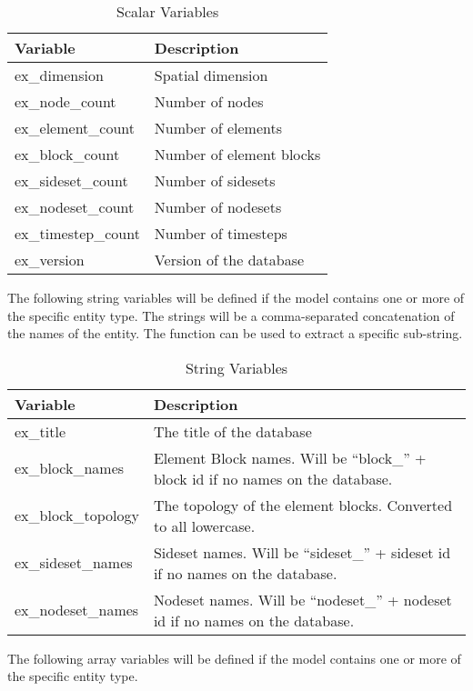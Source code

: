 \begin{longtable}{lp{4.0in}}
\caption{\exo{} Scalar Variables}\\
Variable              & Description \\
\hline
\endhead
ex\_dimension        & Spatial dimension \\
ex\_node\_count      & Number of nodes \\
ex\_element\_count   & Number of elements \\
ex\_block\_count     & Number of element blocks \\
ex\_sideset\_count   & Number of sidesets \\
ex\_nodeset\_count   & Number of nodesets \\
ex\_timestep\_count  & Number of timesteps \\
ex\_version          & Version of the \exo{} database \\
\hline
\end{longtable}

The following string variables will be defined if the model contains
one or more of the specific entity type.  The strings will be a
comma-separated concatenation of the names of the entity.  The
 function can be used to extract a specific sub-string.

\begin{longtable}{lp{4.0in}}
\caption{\exo{} String Variables}\\
Variable              & Description \\
\hline
\endhead
ex\_title            & The title of the database \\
ex\_block\_names     & Element Block names.  Will be ``block\_'' +
block id if no names on the database. \\
ex\_block\_topology  & The topology of the element blocks.  Converted
to all lowercase. \\
ex\_sideset\_names   & Sideset names.  Will be ``sideset\_'' + sideset
id if no names on the database. \\
ex\_nodeset\_names   & Nodeset names.  Will be ``nodeset\_'' + nodeset
id if no names on the database. \\
\hline
\end{longtable}

The following array variables will be defined if the model contains
one or more of the specific entity type.

